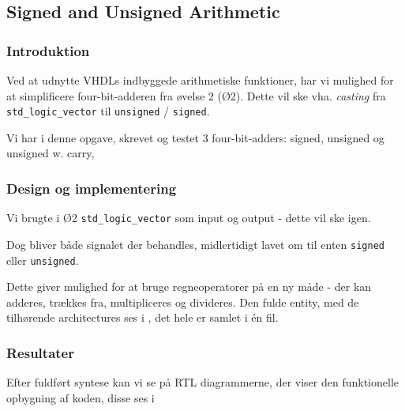 \subsection{Signed and Unsigned Arithmetic}

\subsubsection{Introduktion}

Ved at udnytte VHDLs indbyggede arithmetiske funktioner, har vi mulighed for at simplificere four-bit-adderen fra øvelse 2 (Ø2).
Dette vil ske vha.  \textit{casting} fra \texttt{std\_logic\_vector} til \texttt{unsigned} / \texttt{signed}. 

Vi har i denne opgave, skrevet og testet 3 four-bit-adders: signed, unsigned og unsigned w. carry, 

\subsubsection{Design og implementering}

Vi brugte i Ø2 \texttt{std\_logic\_vector} som input og output - dette vil ske igen. 

Dog bliver både signalet der behandles, midlertidigt lavet om til enten \texttt{signed} eller \texttt{unsigned}.

Dette giver mulighed for at bruge regneoperatorer på en ny måde - der kan adderes, trækkes fra, multipliceres og divideres. Den fulde entity, med de tilhørende architectures ses i , det hele er samlet i én fil.




\subsubsection{Resultater}

Efter fuldført syntese kan vi se på RTL diagrammerne, der viser den funktionelle opbygning af koden, disse ses i 


